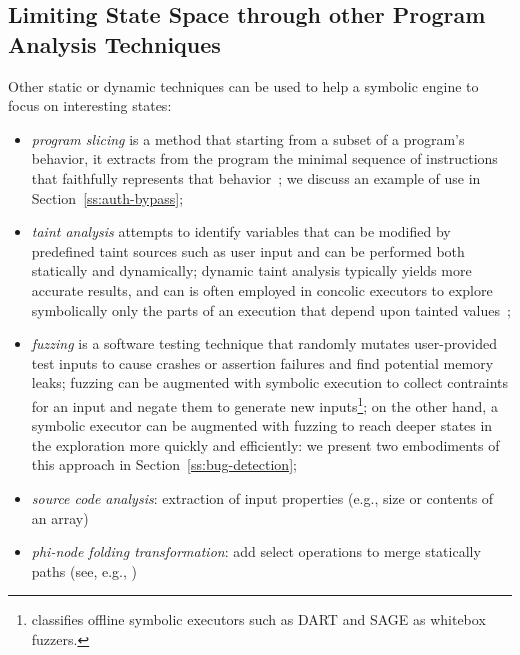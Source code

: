\subsection{Limiting State Space through other Program Analysis Techniques}

Other static or dynamic techniques can be used to help a symbolic engine to focus on interesting states:
\begin{itemize}
  \item {\em program slicing} is a method that starting from a subset of a program's behavior, it extracts from the program the minimal sequence of instructions that faithfully represents that behavior~\cite{Weiser84}; we discuss an example of use in Section~\ref{ss:auth-bypass}; 
  \item {\em taint analysis}  attempts to identify variables that can be modified by predefined taint sources such as user input and can be performed both statically and dynamically; dynamic taint analysis typically yields more accurate results, and can is often employed in concolic executors to explore symbolically only the parts of an execution that depend upon tainted values~\cite{SAB-SP10};
  \item {\em fuzzing} is a software testing technique that randomly mutates user-provided test inputs to cause crashes or assertion failures and find potential memory leaks; fuzzing can be augmented with symbolic execution to collect contraints for an input and negate them to generate new inputs\footnote{\cite{DRILLER-NDSS16} classifies offline symbolic executors such as {\sc DART} and {\sc SAGE} as whitebox fuzzers.}; on the other hand, a symbolic executor can be augmented with fuzzing to reach deeper states in the exploration more quickly and efficiently: we present two embodiments of this approach in Section~\ref{ss:bug-detection}; 
  \item {\em source code analysis}: extraction of input properties (e.g., size or contents of an array)
  \item {\em phi-node folding transformation}: add select operations to merge statically paths (see, e.g., \cite{CCK-EUROSYS11})

\end{itemize}
